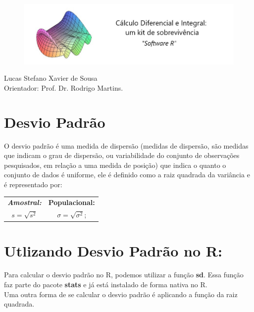 \documentclass[12pt,a4paper]{article}
\begin{document}
	
\begin{figure}[htb]
\includegraphics[scale=0.6]{logo.jpg}
\end{figure}

	
	
	\begin{center}Lucas Stefano Xavier de Sousa \\ Orientador: Prof. Dr. Rodrigo Martins.\end{center}
	
	
	\vspace{2cm}
	
	\section*{Desvio Padrão}
	
	O desvio padrão é uma medida de dispersão (medidas de dispersão, são medidas  que indicam o grau de dispersão, ou variabilidade do conjunto de  observações pesquisados, em relação a uma medida de posição) que indica o quanto o conjunto de dados é uniforme, ele é definido como a raiz quadrada da variância e é representado por:\\
	
	\begin{center}									
		\vspace{0.2cm}
		\begin{tabular}{|c||c|}
			\hline
			\textit{\textbf{Amostral:}} & \textbf{Populacional:} \\
			$s= \sqrt{s^2}$             &  $	\sigma= \sqrt{\sigma^2}$; \\
			\hline
		\end{tabular}
	\end{center}

	
	
	\section*{Utlizando Desvio Padrão no R:}
	
	Para calcular o desvio padrão no R, podemos utilizar a função \textbf{sd}. Essa função faz parte do pacote \textbf{stats} e já está instalado de forma nativa no R.\\
	Uma outra forma de se calcular o desvio padrão é aplicando a função da raiz quadrada. \\
\end{document}
